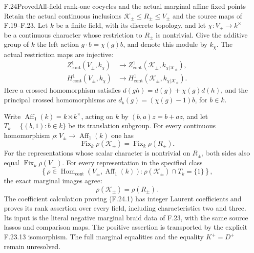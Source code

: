 \begin{claim}{F.24}{Proved}{All-field rank-one cocycles and the actual marginal affine fixed points}
Retain the actual continuous inclusions
$\mathcal K_\pm\leq R_\pm\leq V_\pm$ and the source maps of
F.19--F.23. Let $k$ be a finite field, with its discrete topology,
and let $\chi:V_\pm\to k^\times$ be a continuous character whose
restriction to $R_\pm$ is nontrivial. Give the additive group of
$k$ the left action $g\cdot b=\chi(g)b$, and denote this module
by $k_\chi$. The actual restriction maps are injective:
\[
\begin{aligned}
 Z^1_{\mathrm{cont}}(V_\pm,k_\chi)&\longrightarrow
 Z^1_{\mathrm{cont}}(\mathcal K_\pm,k_{\chi|\mathcal K_\pm}),\\
 H^1_{\mathrm{cont}}(V_\pm,k_\chi)&\longrightarrow
 H^1_{\mathrm{cont}}(\mathcal K_\pm,k_{\chi|\mathcal K_\pm}).
\end{aligned}                                                   \tag{F.24.1}
\]
Here a crossed homomorphism satisfies
$d(gh)=d(g)+\chi(g)d(h)$, and the principal crossed
homomorphisms are $d_b(g)=(\chi(g)-1)b$, for $b\in k$.

Write $\operatorname{Aff}_1(k)=k\rtimes k^\times$, acting on
$k$ by $(b,a)z=b+az$, and let
$T_k=\{(b,1):b\in k\}$ be its translation subgroup.
For every continuous homomorphism
$\rho:V_\pm\to\operatorname{Aff}_1(k)$ one has
\[
 \operatorname{Fix}_k\rho(\mathcal K_\pm)
       =\operatorname{Fix}_k\rho(R_\pm).                        \tag{F.24.2}
\]
For the representations whose scalar character is nontrivial
on $R_\pm$, both sides also equal
$\operatorname{Fix}_k\rho(V_\pm)$.
For every representation in the specified class
\[
 \left\{\rho\in\operatorname{Hom}_{\mathrm{cont}}
       (V_\pm,\operatorname{Aff}_1(k)):
           \rho(\mathcal K_\pm)\cap T_k=\{1\}\right\},
\]
the exact marginal images agree:
\[
                 \rho(\mathcal K_\pm)=\rho(R_\pm).             \tag{F.24.3}
\]
The coefficient calculation proving (F.24.1) has integer
Laurent coefficients and proves its rank assertion over every
field, including characteristics two and three. Its input is
the literal negative marginal braid data of F.23, with the
same source lassos and comparison maps. The positive assertion
is transported by the explicit F.23.13 isomorphism.
The full marginal equalities and the equality $K^+=D^+$
remain unresolved.
\end{claim}

